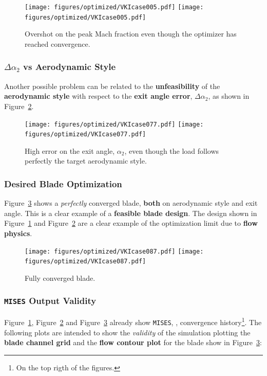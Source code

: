 \begin{figure}[!ht]
    \centering
    \texttt{[image: figures/optimized/VKIcase005.pdf]}
    \texttt{[image: figures/optimized/VKIcase005.pdf]}
    \caption{Overshot on the peak Mach fraction even though the optimizer has reached convergence.}
    \label{fig:opt0}
\end{figure}

\subsubsection{$\Delta \alpha_2$ vs Aerodynamic Style}

Another possible problem can be related to the \textbf{unfeasibility} of the \textbf{aerodynamic style} with respect to the \textbf{exit angle error}, $\Delta \alpha_2$, as shown in Figure~\ref{fig:opt1}.

\begin{figure}[!ht]
    \centering
    \texttt{[image: figures/optimized/VKIcase077.pdf]}
    \texttt{[image: figures/optimized/VKIcase077.pdf]}
    \caption{High error on the exit angle, $\alpha_2$, even though the load follows perfectly the target aerodynamic style.}
    \label{fig:opt1}
\end{figure}

\newpage

\subsubsection{Desired Blade Optimization}

Figure~\ref{fig:opt2} shows a \textit{perfectly} converged blade, \textbf{both} on aerodynamic style and exit angle. This is a clear example of a \textbf{feasible blade design}. The design shown in Figure~\ref{fig:opt0} and Figure~\ref{fig:opt1} are a clear example of the optimization limit due to \textbf{flow physics}.

\begin{figure}[!ht]
    \centering
    \texttt{[image: figures/optimized/VKIcase087.pdf]}
    \texttt{[image: figures/optimized/VKIcase087.pdf]}
    \caption{Fully converged blade.}
    \label{fig:opt2}
\end{figure}

\subsubsection{\texttt{MISES} Output Validity}

Figure~\ref{fig:opt0}, Figure~\ref{fig:opt1} and Figure~\ref{fig:opt2} already show \texttt{MISES}, \cite{drela2008user}, convergence history\footnote{On the top rigth of the figures.}. 
The following plots are intended to show the \textit{validity} of the simulation plotting the \textbf{blade channel grid} and the \textbf{flow contour plot} for the blade show in Figure~\ref{fig:opt2}:

